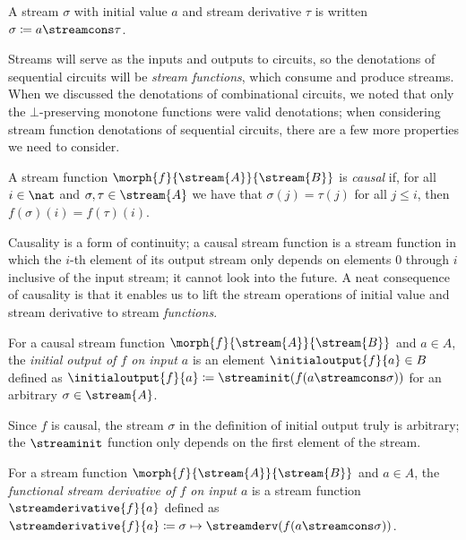 \documentclass{lmcs}
\begin{document}
\begin{nota}
    A stream \(\sigma\) with initial value \(a\) and stream derivative
    \(\tau\) is written \(\sigma \coloneqq a \streamcons \tau\).
\end{nota}

Streams will serve as the inputs and outputs to circuits, so the denotations of
sequential circuits will be \emph{stream functions}, which consume and produce
streams.
When we discussed the denotations of combinational circuits, we noted that only
the \(\bot\)-preserving monotone functions were valid denotations; when
considering stream function denotations of sequential circuits, there are a few
more properties we need to consider.

\begin{defi}
    A stream function \(\morph{f}{\stream{A}}{\stream{B}}\) is \emph{causal} if,
    for all \(i \in \nat\) and \(\sigma,\tau \in \stream{A}\) we have that
    \(\sigma(j) = \tau(j)\) for all \(j \leq i\), then
    \(f(\sigma)(i) = f(\tau)(i)\).
\end{defi}

Causality is a form of continuity; a causal stream function is a stream function
in which the \(i\)-th element of its output stream only depends on elements
\(0\) through \(i\) inclusive of the input stream; it cannot look into the
future.
A neat consequence of causality is that it enables us to lift the stream
operations of initial value and stream derivative to stream \emph{functions}.

\begin{defi}
    For a causal stream function \(\morph{f}{\stream{A}}{\stream{B}}\) and
    \(a \in A\), the \emph{initial output of \(f\) on input \(a\)} is an element
    \(\initialoutput{f}{a} \in B\) defined as
    \(\initialoutput{f}{a} \coloneqq \streaminit(f(a \streamcons \sigma))\) for
    an arbitrary \(\sigma \in \stream{A}\).
\end{defi}

Since \(f\) is causal, the stream \(\sigma\) in the definition of initial
output truly is arbitrary; the \(\streaminit\) function only depends on the
first element of the stream.

\begin{defi}
    For a stream function \(\morph{f}{\stream{A}}{\stream{B}}\) and
    \(a \in A\), the
    \emph{functional stream derivative of \(f\) on input \(a\)} is a stream
    function \(\streamderivative{f}{a}\) defined as \(
    \streamderivative{f}{a}
    \coloneqq
    \sigma \mapsto \streamderv(f(a \streamcons \sigma))
    \).
\end{defi}
\end{document}

